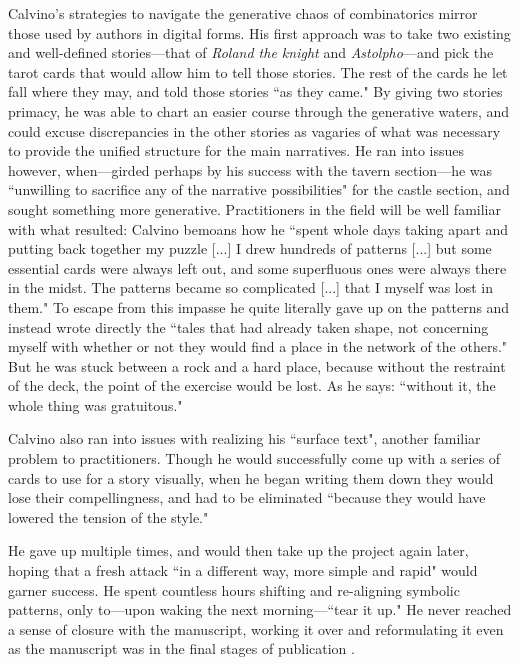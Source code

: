 Calvino's strategies to navigate the generative chaos of combinatorics mirror those used by authors in digital forms. His first approach was to take two existing and well-defined stories---that of \textit{Roland the knight} and \textit{Astolpho}---and pick the tarot cards that would allow him to tell those stories. The rest of the cards he let fall where they may, and told those stories ``as they came." By giving two stories primacy, he was able to chart an easier course through the generative waters, and could excuse discrepancies in the other stories as vagaries of what was necessary to provide the unified structure for the main narratives. He ran into issues however, when---girded perhaps by his success with the tavern section---he was ``unwilling to sacrifice any of the narrative possibilities" for the castle section, and sought something more generative. Practitioners in the field will be well familiar with what resulted: Calvino bemoans how he ``spent whole days taking apart and putting back together my puzzle [...] I drew hundreds of patterns [...] but some essential cards were always left out, and some superfluous ones were always there in the midst. The patterns became so complicated [...] that I myself was lost in them." To escape from this impasse he quite literally gave up on the patterns and instead wrote directly the ``tales that had already taken shape, not concerning myself with whether or not they would find a place in the network of the others." But he was stuck between a rock and a hard place, because without the restraint of the deck, the point of the exercise would be lost. As he says: ``without it, the whole thing was gratuitous."

Calvino also ran into issues with realizing his ``surface text", another familiar problem to practitioners. Though he would successfully come up with a series of cards to use for a story visually, when he began writing them down they would lose their compellingness, and had to be eliminated ``because they would have lowered the tension of the style."

He gave up multiple times, and would then take up the project again later, hoping that a fresh attack ``in a different way, more simple and rapid" would garner success. He spent countless hours shifting and re-aligning symbolic patterns, only to---upon waking the next morning---``tear it up." He never reached a sense of closure with the manuscript, working it over and reformulating it even as the manuscript was in the final stages of publication \cite{crossed_destinies}.

